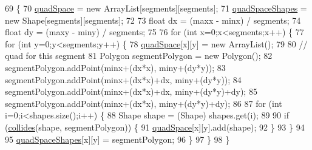 \begin{DoxyCode}
69                                                                                                            
          \{
70         \mbox{\hyperlink{classorg_1_1newdawn_1_1slick_1_1tests_1_1_geom_util_tile_test_a669ad26af6e1635deb8855d2df3788bb}{quadSpace}} = \textcolor{keyword}{new} ArrayList[segments][segments];
71         \mbox{\hyperlink{classorg_1_1newdawn_1_1slick_1_1tests_1_1_geom_util_tile_test_ac0451795d8b1fc03cbd0c348e32e86c8}{quadSpaceShapes}} = \textcolor{keyword}{new} Shape[segments][segments];
72         
73         \textcolor{keywordtype}{float} dx = (maxx - minx) / segments;
74         \textcolor{keywordtype}{float} dy = (maxy - miny) / segments;
75         
76         \textcolor{keywordflow}{for} (\textcolor{keywordtype}{int} x=0;x<segments;x++) \{
77             \textcolor{keywordflow}{for} (\textcolor{keywordtype}{int} y=0;y<segments;y++) \{
78                 \mbox{\hyperlink{classorg_1_1newdawn_1_1slick_1_1tests_1_1_geom_util_tile_test_a669ad26af6e1635deb8855d2df3788bb}{quadSpace}}[x][y] = \textcolor{keyword}{new} ArrayList();
79                 
80                 \textcolor{comment}{// quad for this segment}
81                 Polygon segmentPolygon = \textcolor{keyword}{new} Polygon();
82                 segmentPolygon.addPoint(minx+(dx*x), miny+(dy*y));
83                 segmentPolygon.addPoint(minx+(dx*x)+dx, miny+(dy*y));
84                 segmentPolygon.addPoint(minx+(dx*x)+dx, miny+(dy*y)+dy);
85                 segmentPolygon.addPoint(minx+(dx*x), miny+(dy*y)+dy);
86                 
87                 \textcolor{keywordflow}{for} (\textcolor{keywordtype}{int} i=0;i<shapes.size();i++) \{
88                     Shape shape = (Shape) shapes.get(i);
89                     
90                     \textcolor{keywordflow}{if} (\mbox{\hyperlink{classorg_1_1newdawn_1_1slick_1_1tests_1_1_geom_util_tile_test_acc2015685ff9204e107a3bfff49459fb}{collides}}(shape, segmentPolygon)) \{
91                         \mbox{\hyperlink{classorg_1_1newdawn_1_1slick_1_1tests_1_1_geom_util_tile_test_a669ad26af6e1635deb8855d2df3788bb}{quadSpace}}[x][y].add(shape);
92                     \}
93                 \}
94                 
95                 \mbox{\hyperlink{classorg_1_1newdawn_1_1slick_1_1tests_1_1_geom_util_tile_test_ac0451795d8b1fc03cbd0c348e32e86c8}{quadSpaceShapes}}[x][y] = segmentPolygon;
96             \}
97         \}
98     \}
\end{DoxyCode}
\mbox{\label{classorg_1_1newdawn_1_1slick_1_1tests_1_1_geom_util_tile_test_adcd610185aaa46c043a85572ee6fb8fa}} 
